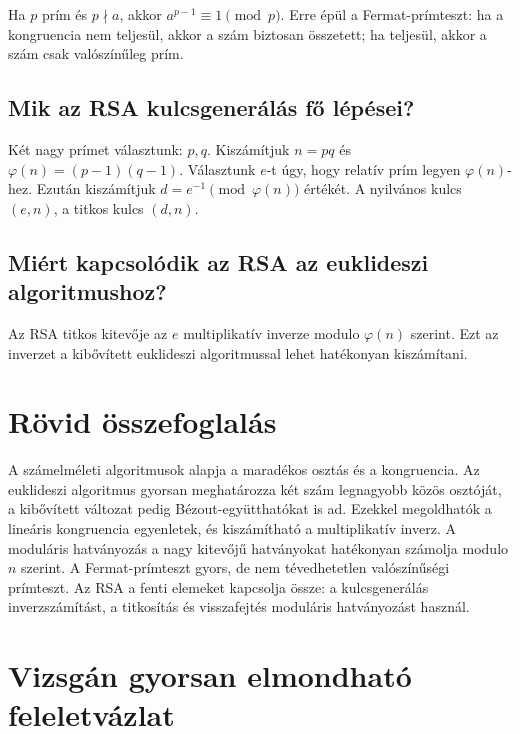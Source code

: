 Ha $p$ prím és $p\nmid a$, akkor $a^{p-1}\equiv1\pmod p$. Erre épül a Fermat-prímteszt: ha a kongruencia nem teljesül, akkor a szám biztosan összetett; ha teljesül, akkor a szám csak valószínűleg prím.

\subsection{Mik az RSA kulcsgenerálás fő lépései?}

Két nagy prímet választunk: $p,q$. Kiszámítjuk $n=pq$ és $\varphi(n)=(p-1)(q-1)$. Választunk $e$-t úgy, hogy relatív prím legyen $\varphi(n)$-hez. Ezután kiszámítjuk $d=e^{-1}\pmod{\varphi(n)}$ értékét. A nyilvános kulcs $(e,n)$, a titkos kulcs $(d,n)$.

\subsection{Miért kapcsolódik az RSA az euklideszi algoritmushoz?}

Az RSA titkos kitevője az $e$ multiplikatív inverze modulo $\varphi(n)$ szerint. Ezt az inverzet a kibővített euklideszi algoritmussal lehet hatékonyan kiszámítani.

\section{Rövid összefoglalás}

\begin{summarybox}
A számelméleti algoritmusok alapja a maradékos osztás és a kongruencia. Az euklideszi algoritmus gyorsan meghatározza két szám legnagyobb közös osztóját, a kibővített változat pedig Bézout-együtthatókat is ad. Ezekkel megoldhatók a lineáris kongruencia egyenletek, és kiszámítható a multiplikatív inverz. A moduláris hatványozás a nagy kitevőjű hatványokat hatékonyan számolja modulo $n$ szerint. A Fermat-prímteszt gyors, de nem tévedhetetlen valószínűségi prímteszt. Az RSA a fenti elemeket kapcsolja össze: a kulcsgenerálás inverzszámítást, a titkosítás és visszafejtés moduláris hatványozást használ.
\end{summarybox}

\section{Vizsgán gyorsan elmondható feleletvázlat}

